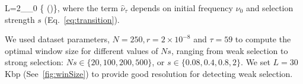 \beq L=2\min_{\nu_0} \left\{
  \log\left(\right)\right\},
\eeq where the term $\hat{\nu}_\tau$ depends on initial frequency
$\nu_0$ and selection strength $s$ (Eq.~\ref{eq:transition}).


We used \dmel dataset parameters, $N=250,r=2\times10^{-8}$ and
$\tau=59$ to compute the optimal window size for different values of
$Ns$, ranging from weak selection to strong selection:
$Ns\in\{20,100,200,500\}$, or $s\in\{0.08,0.4,0.8,2\}$.  We set
$L=30$Kbp (See~\ref{fig:winSize}) to provide good resolution for
detecting weak selection.








